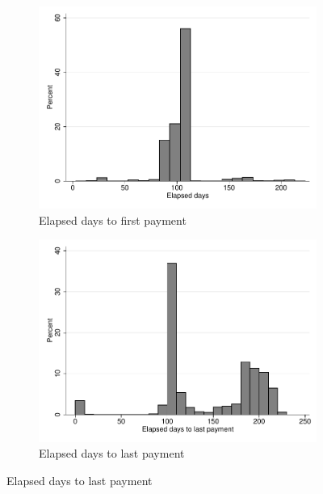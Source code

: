\documentclass[11pt]{article}
\begin{document}
\vspace{.2in}
\begin{figure}[H]
    \caption{Behavior of those who lost pawn}
    \label{proxy_naive}
    \begin{center}
    \begin{subfigure}{0.40\textwidth}
        \caption{Elapsed days to first payment}
        \centering
        \includegraphics[width=\textwidth]{Figuras/hist_firstdays_default.pdf}
    \end{subfigure}
    \begin{subfigure}{0.40\textwidth}
        \caption{Elapsed days to last payment}
        \centering
        \includegraphics[width=\textwidth]{Figuras/hist_days_default.pdf}
    \end{subfigure}

\end{center}
\end{figure}
\end{document}
